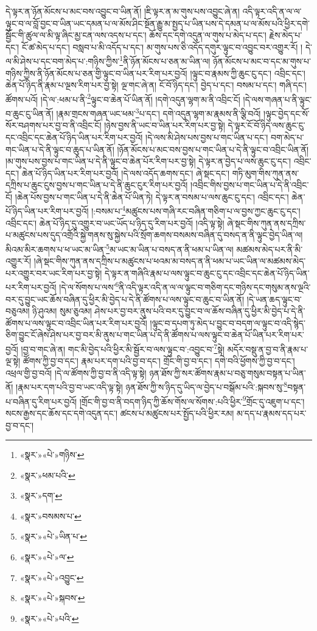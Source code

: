 དེ་ལྟར་ན་ཉོན་མོངས་པ་མང་བས་འབྱུང་བ་ཡིན་ནོ། །ཇི་ལྟར་ན་མ་གུས་པས་འབྱུང་ཞེ་ན། འདི་ལྟར་འདི་ན་ལ་ལ་ལྟུང་བ་ལ་བློ་བྱང་བ་ཡིན་ཡང་དམན་པ་ལ་མོས་ཤིང་སྔོན་རྒྱུ་མ་སྤྱད་པ་ཡིན་པས་དེ་དམན་པ་ལ་མོས་པའི་ཕྱིར་དགེ་སྦྱོང་གི་ཚུལ་ལ་མི་ལྟ་ཞིང་མྱ་ངན་ལས་འདས་པ་དང་། ཆོས་དང་དགེ་འདུན་ལ་གུས་པ་མེད་པ་དང་། རྗེས་མེད་པ་དང་། ངོ་ཚ་མེད་པ་དང་། བསླབ་པ་མི་འདོད་པ་དང་། མ་གུས་པས་ཅི་འདོད་དགུར་ལྟུང་བ་འབྱུང་བར་འགྱུར་རོ། །
དེ་ལ་མི་ཤེས་པ་དང་བག་མེད་པ་:གཉིས་ཀྱིས་\footnote{«སྣར་»«པེ་»གཉིས་}ནི་ཉོན་མོངས་པ་ཅན་མ་ཡིན་ལ། ཉོན་མོངས་པ་མང་བ་དང་མ་གུས་པ་གཉིས་ཀྱིས་ནི་ཉོན་མོངས་པ་ཅན་གྱི་ལྟུང་བ་ཡིན་པར་རིག་པར་བྱའོ། །ལྟུང་བ་རྣམས་ཀྱི་ཆུང་ངུ་དང་། འབྲིང་དང་། ཆེན་པོ་ཉིད་ནི་རྣམ་པ་ལྔས་རིག་པར་བྱ་སྟེ། ལྔ་གང་ཞེ་ན། ངོ་བོ་ཉིད་དང་། བྱེད་པ་དང་། བསམ་པ་དང་། གཞི་དང་། ཚོགས་པའོ། །དེ་ལ་:ཕམ་པ་ནི་\footnote{«སྣར་»ཕམ་པའི་}ལྟུང་བ་ཆེན་པོ་ཡིན་ནོ། །དགེ་འདུན་ལྷག་མ་ནི་འབྲིང་ངོ། །དེ་ལས་གཞན་པ་ནི་ལྟུང་བ་ཆུང་ངུ་ཡིན་ནོ། །རྣམ་གྲངས་གཞན་ཡང་ཕམ་\footnote{«སྣར་»དག་}པ་དང་། དགེ་འདུན་ལྷག་མ་རྣམས་ནི་ལྕི་བའོ། །ལྟུང་བྱེད་དང་སོ་སོར་བཤགས་པར་བྱ་བ་ནི་འབྲིང་ངོ། །ཉེས་བྱས་ནི་ཡང་བ་ཡིན་པར་རིག་པར་བྱ་སྟེ། དེ་ལྟར་ངོ་བོ་ཉིད་ལས་ཆུང་ངུ་དང་འབྲིང་དང་ཆེན་པོ་ཉིད་ཡིན་པར་རིག་པར་བྱའོ། །དེ་ལས་མི་ཤེས་པས་བྱས་པ་གང་ཡིན་པ་དང་། བག་མེད་པ་གང་ཡིན་པ་དེ་ནི་ལྟུང་བ་ཆུད་པ་ཡིན་ནོ། །ཉོན་མོངས་པ་མང་བས་བྱས་པ་གང་ཡིན་པ་དེ་ནི་ལྟུང་བ་འབྲིང་ཡིན་ནོ། །མ་གུས་པས་བྱས་པ་གང་ཡིན་པ་དེ་ནི་ལྟུང་བ་ཆེན་པོར་རིག་པར་བྱ་སྟེ། དེ་ལྟར་ན་བྱེད་པ་ལས་ཆུང་ངུ་དང་། འབྲིང་དང་། ཆེན་པོ་ཉིད་ཡིན་པར་རིག་པར་བྱའོ། །དེ་ལས་འདོད་ཆགས་དང་། ཞེ་སྡང་དང་། གཏི་མུག་གིས་ཀུན་ནས་དཀྲིས་པ་ཆུང་ངུས་བྱས་པ་གང་ཡིན་པ་དེ་ནི་ཆུང་ངུར་རིག་པར་བྱའོ། །འབྲིང་གིས་བྱས་པ་གང་ཡིན་པ་དེ་ནི་འབྲིང་ངོ། །ཆེན་པོས་བྱས་པ་གང་ཡིན་པ་དེ་ནི་ཆེན་པོ་ཡིན་ཏེ། དེ་ལྟར་ན་བསམ་པ་ལས་ཆུང་ངུ་དང་། འབྲིང་དང་། ཆེན་པོ་ཉིད་ཡིན་པར་རིག་པར་བྱའོ། །:བསམ་པ་\footnote{«སྣར་»བསམས་པ་}མཚུངས་པས་གཞི་རང་བཞིན་གཅིག་པ་ལ་བྱས་ཀྱང་ཆུང་ངུ་དང་། འབྲིང་དང་། ཆེན་པོ་ཉིད་དུ་འགྱུར་བ་ཡང་ཡོད་པ་ཉིད་དུ་རིག་པར་བྱའོ། །འདི་ལྟ་སྟེ། ཞེ་སྡང་གིས་ཀུན་ནས་དཀྲིས་པ་མཚུངས་པས་དུད་འགྲོའི་སྐྱེ་གནས་སུ་སྐྱེས་པའི་སྲོག་ཆགས་བསམས་བཞིན་དུ་བསད་ན་ནི་ལྟུང་བྱེད་ཡིན་ལ། མིའམ་མིར་ཆགས་པ་ཕ་ཡང་མ་ཡིན་\footnote{«སྣར་»«པེ་»ཡིན་པ་}མ་ཡང་མ་ཡིན་པ་བསད་ན་ནི་ཕམ་པ་ཡིན་ལ། མཚམས་མེད་པར་ནི་མི་འགྱུར་རོ། །ཞེ་སྡང་གིས་ཀུན་ནས་དཀྲིས་པ་མཚུངས་པ་ཕའམ་མ་བསད་ན་ནི་ཕམ་པ་ཡང་ཡིན་ལ་མཚམས་མེད་པར་འགྱུར་བར་ཡང་རིག་པར་བྱ་སྟེ། དེ་ལྟར་ན་གཞིའི་རྣམ་པ་ལས་ལྟུང་བ་ཆུང་ངུ་དང་འབྲིང་དང་ཆེན་པོ་ཉིད་ཡིན་པར་རིག་པར་བྱའོ། །དེ་ལ་སོགས་པ་ལས་\footnote{«སྣར་»«པེ་»ལ་}ནི་འདི་ལྟར་འདི་ན་ལ་ལ་ལྟུང་བ་གཅིག་དང་གཉིས་དང་གསུམ་ནས་ལྔའི་བར་དུ་བྱུང་ཡང་ཆོས་བཞིན་དུ་ཕྱིར་མི་བྱེད་པ་དེ་ནི་ཚོགས་པ་ལས་ལྟུང་བ་ཆུང་བ་ཡིན་ནོ། །དེ་ཡན་ཆད་ལྟུང་བ་བཅུའམ། ཉི་ཤུའམ། སུམ་ཅུའམ། ཤེས་པར་བྱ་བར་ནུས་པའི་བར་དུ་བྱུང་བ་ལ་ཆོས་བཞིན་དུ་ཕྱིར་མི་བྱེད་པ་དེ་ནི་ཚོགས་པ་ལས་ལྟུང་བ་འབྲིང་ཡིན་པར་རིག་པར་བྱའོ། །ལྟུང་བ་དཔག་ཏུ་མེད་པ་བྱུང་བ་བདག་ལ་ལྟུང་བ་འདི་སྙེད་ཅིག་བྱུང་ངོ་ཞེས་ཤེས་པར་བྱ་བར་མི་ནུས་པ་གང་ཡིན་པ་དེ་ནི་ཚོགས་པ་ལས་ལྟུང་བ་ཆེན་པོ་ཡིན་པར་རིག་པར་བྱའོ། །བྱ་བ་གང་ཞེ་ན། གང་མི་བྱེད་པའི་ཕྱིར་མི་སྦྱོར་བ་ལས་ལྟུང་བ་:འབྱུང་བ་\footnote{«སྣར་»«པེ་»འབྱུང་}སྟེ། མདོར་བསྡུ་ན་བྱ་བ་ནི་རྣམ་པ་ལྔ་སྟེ། ཚོགས་ཀྱི་བྱ་བ་དང་། རྣམ་པར་དག་པའི་བྱ་བ་དང་། གྲོང་གི་བྱ་བ་དང་། དགེ་བའི་ཕྱོགས་ཀྱི་བྱ་བ་དང་། འཕྲལ་གྱི་བྱ་བའོ། །དེ་ལ་ཚོགས་ཀྱི་བྱ་བ་ནི་འདི་ལྟ་སྟེ། ཉན་ཐོས་ཀྱི་སར་ཚོགས་རྣམ་པ་བཅུ་གསུམ་བསྟན་པ་ཡིན་ནོ། །རྣམ་པར་དག་པའི་བྱ་བ་ཡང་འདི་ལྟ་སྟེ། ཉན་ཐོས་ཀྱི་ས་ཉིད་དུ་ཡིད་ལ་བྱེད་པ་བསྒོམ་པའི་:སྐབས་སུ་\footnote{«སྣར་»«པེ་»སྐབས་}བསྟན་པ་བཞིན་དུ་རིག་པར་བྱའོ། །གྲོང་གི་བྱ་བ་ནི་བདག་ཉིད་ཀྱི་ཆོས་གོས་ལ་སོགས་:པའི་ཕྱིར་\footnote{«སྣར་»«པེ་»པའི་}གྲོང་དུ་འཇུག་པ་དང་། སངས་རྒྱས་དང་ཆོས་དང་དགེ་འདུན་དང་། ཚངས་པ་མཚུངས་པར་སྤྱོད་པའི་ཕྱིར་རམ། མ་དད་པ་རྣམས་དད་པར་བྱ་བ་དང་། 